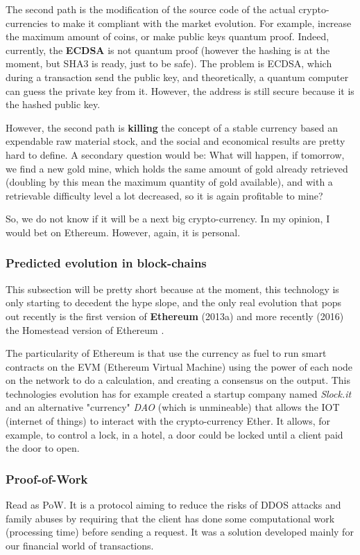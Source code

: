 The second path is the modification of the source code of the actual crypto-currencies to make it compliant with the market evolution. For example, increase the maximum amount of coins, or make public keys quantum proof. Indeed, currently, the \textbf{ECDSA} is not quantum proof (however the hashing is at the moment, but SHA3 is ready, just to be safe). The problem is ECDSA, which during a transaction send the public key, and theoretically, a quantum computer can guess the private key from it. However, the address is still secure because it is the hashed public key.

However, the second path is \textbf{killing} the concept of a stable currency based an expendable raw material stock, and the social and economical results are pretty hard to define. A secondary question would be: What will happen, if tomorrow, we find a new gold mine, which holds the same amount of gold already retrieved (doubling by this mean the maximum quantity of gold available), and with a retrievable difficulty level a lot decreased, so it is again profitable to mine?

So, we do not know if it will be a next big crypto-currency. In my opinion, I would bet on Ethereum. However, again, it is personal.

\subsubsection{Predicted evolution in block-chains}
This subsection will be pretty short because at the moment, this technology is only starting to decedent the hype slope, and the only real evolution that pops out recently is the first version of  \textbf{Ethereum}\cite{VitalikButerin2013APlatform} (2013a) and more recently (2016) the Homestead version of Ethereum \cite{DR.GAVINWOOD2015ETHEREUM:DRAFT}.

The particularity of Ethereum is that use the currency as fuel to run smart contracts on the EVM (Ethereum Virtual Machine) using the power of each node on the network to do a calculation, and creating a consensus on the output. This technologies evolution has for example created a startup company named \textit{Slock.it} and an alternative "currency" \textit{DAO} (which is unmineable) that allows the IOT (internet of things) to interact with the crypto-currency Ether. It allows, for example, to control a lock, in a hotel, a door could be locked until a client paid the door to open.

\subsubsection{Proof-of-Work}
Read as PoW\cite{Dwork1993PricingMail, Jakobsson1999ProofsAbstract}. It is a protocol aiming to reduce the risks of DDOS attacks and family abuses by requiring that the client has done some computational work (processing time) before sending a request. It was a solution developed mainly for our financial world of transactions.

